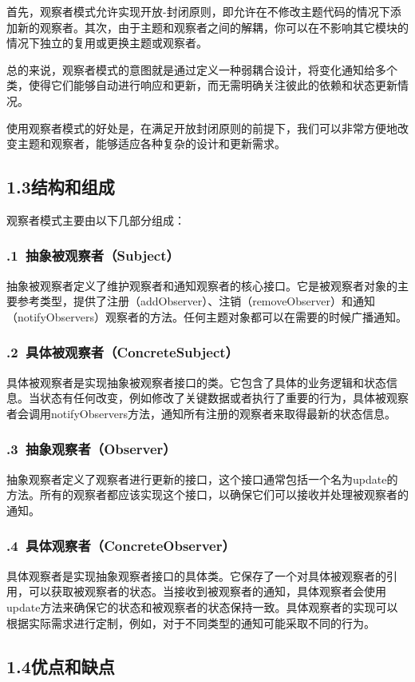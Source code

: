 \documentclass[24pt,a4paper]{article}%
\begin{document}
首先，观察者模式允许实现开放-封闭原则，即允许在不修改主题代码的情况下添加新的观察者。其次，由于主题和观察者之间的解耦，你可以在不影响其它模块的情况下独立的复用或更换主题或观察者。

总的来说，观察者模式的意图就是通过定义一种弱耦合设计，将变化通知给多个类，使得它们能够自动进行响应和更新，而无需明确关注彼此的依赖和状态更新情况。

使用观察者模式的好处是，在满足开放封闭原则的前提下，我们可以非常方便地改变主题和观察者，能够适应各种复杂的设计和更新需求。
\subsection*{\songti 1.3结构和组成}
观察者模式主要由以下几部分组成：
\subsubsection*{.1\ 抽象被观察者（Subject）}
抽象被观察者定义了维护观察者和通知观察者的核心接口。它是被观察者对象的主要参考类型，提供了注册（addObserver）、注销（removeObserver）和通知（notifyObservers）观察者的方法。任何主题对象都可以在需要的时候广播通知。
\subsubsection*{.2\ 具体被观察者（ConcreteSubject）}
具体被观察者是实现抽象被观察者接口的类。它包含了具体的业务逻辑和状态信息。当状态有任何改变，例如修改了关键数据或者执行了重要的行为，具体被观察者会调用notifyObservers方法，通知所有注册的观察者来取得最新的状态信息。
\subsubsection*{.3\ 抽象观察者（Observer）}
抽象观察者定义了观察者进行更新的接口，这个接口通常包括一个名为update的方法。所有的观察者都应该实现这个接口，以确保它们可以接收并处理被观察者的通知。
\subsubsection*{.4\ 具体观察者（ConcreteObserver）}
具体观察者是实现抽象观察者接口的具体类。它保存了一个对具体被观察者的引用，可以获取被观察者的状态。当接收到被观察者的通知，具体观察者会使用update方法来确保它的状态和被观察者的状态保持一致。具体观察者的实现可以根据实际需求进行定制，例如，对于不同类型的通知可能采取不同的行为。
\subsection*{\songti 1.4优点和缺点}
\end{document}
